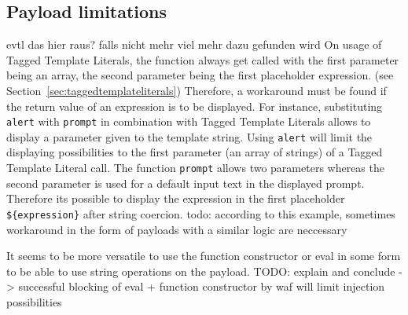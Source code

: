 \subsection{Payload limitations}
\label{sec:payloadlimitations}
{\color{blue} evtl das hier raus? falls nicht mehr viel mehr dazu gefunden wird}
On usage of Tagged Template Literals, the function always get called with the first parameter being an array, the second parameter being the first placeholder expression. (see Section~\ref{sec:taggedtemplateliterals}) Therefore, a workaround must be found if the return value of an expression is to be displayed. For instance, substituting \verb|alert| with \verb|prompt| in combination with Tagged Template Literals allows to display a parameter given to the template string. Using \verb|alert| will limit the displaying possibilities to the first parameter (an array of strings) of a Tagged Template Literal call. The function \verb|prompt| allows two parameters whereas the second parameter is used for a default input text in the displayed prompt. \cite{js/prompt} Therefore its possible to display the expression in the first placeholder \verb|${expression}| after string coercion. {\color{red} todo: according to this example, sometimes workaround in the form of payloads with a similar logic are neccessary}

It seems to be more versatile to use the function constructor or eval in some form to be able to use string operations on the payload. {\color{red} TODO: explain and conclude -> successful blocking of eval + function constructor by waf will limit injection possibilities}
